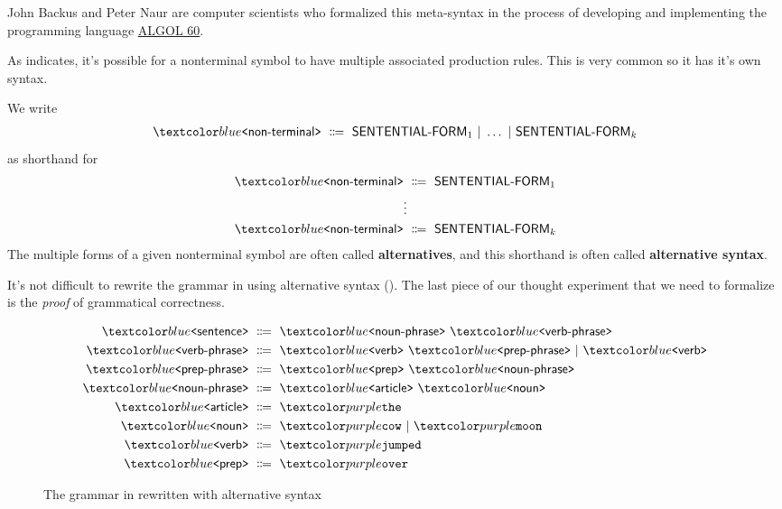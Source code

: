 \begin{remark}
  John Backus and Peter Naur are computer scientists who formalized this meta-syntax in the process of developing and implementing the programming language \href{https://dl.acm.org/doi/pdf/10.1145/366193.366201}{ALGOL 60}.
\end{remark}
%
As  indicates, it's possible for a nonterminal symbol to have multiple associated production rules.
This is very common so it has it's own syntax.
%
\begin{definition}
We write
%
\begin{align*}
\bnfnt{non-terminal} \bnfeq \textsf{SENTENTIAL-FORM}_1 \bnfalt \dots \bnfalt \textsf{SENTENTIAL-FORM}_k
\end{align*}
%
as shorthand for
%
\begin{align*}
\bnfnt{non-terminal} &\bnfeq \textsf{SENTENTIAL-FORM}_1 \\
&\vdots \\
\bnfnt{non-terminal} &\bnfeq \textsf{SENTENTIAL-FORM}_k
\end{align*}
%
The multiple forms of a given nonterminal symbol are often called \textbf{alternatives}, and this shorthand is often called \textbf{alternative syntax}.
\end{definition}
%
It's not difficult to rewrite the grammar in  using alternative syntax ().
The last piece of our thought experiment that we need to formalize is the \textit{proof} of grammatical correctness.

\begin{figure}
\begin{align*}
\bnfnt{sentence} &\bnfeq \bnfnt{noun-phrase} \ \bnfnt{verb-phrase} \\
\bnfnt{verb-phrase} &\bnfeq \bnfnt{verb} \ \bnfnt{prep-phrase} \bnfalt \bnfnt{verb} \\
\bnfnt{prep-phrase} &\bnfeq \bnfnt{prep} \ \bnfnt{noun-phrase} \\
\bnfnt{noun-phrase} &\bnfeq \bnfnt{article} \ \bnfnt{noun} \\
\bnfnt{article} &\bnfeq \bnft{the} \\
\bnfnt{noun} &\bnfeq \bnft{cow} \bnfalt \bnft{moon} \\
\bnfnt{verb} &\bnfeq \bnft{jumped} \\
\bnfnt{prep} &\bnfeq \bnft{over}
\end{align*}
\caption{The grammar in  rewritten with alternative syntax}
\label{fig:simple-grammar-alt}
\end{figure}

